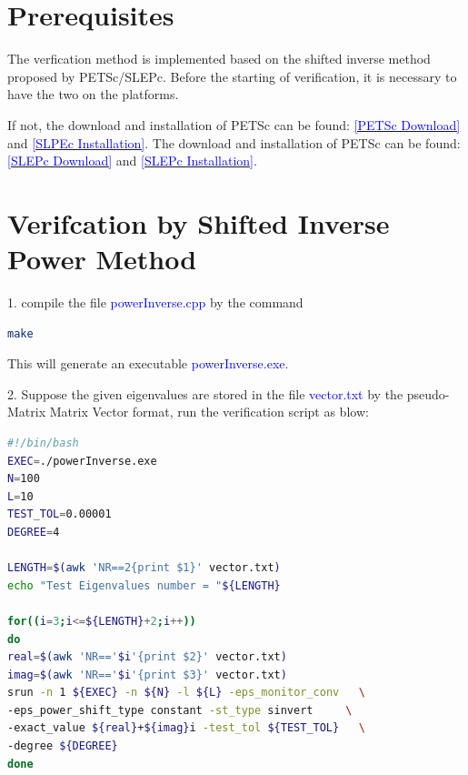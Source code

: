\documentclass[a4paper, 10 pt]{report}
\begin{document}
	\section{Prerequisites}
	
	The verfication method is implemented based on the shifted inverse method proposed by PETSc/SLEPc. Before the starting of verification, it is necessary to have the two on the platforms.
	
	If not, the download and installation of PETSc can be found: \href{https://www.mcs.anl.gov/petsc/download/index.html}{\textcolor{blue}{[PETSc Download]}} and \href{https://www.mcs.anl.gov/petsc/documentation/installation.html}{\textcolor{blue}{[SLPEc Installation]}}. The download and installation of PETSc can be found: \href{http://slepc.upv.es/download/}{\textcolor{blue}{[SLEPc Download]}} and \href{http://slepc.upv.es/documentation/instal.htm}{\textcolor{blue}{[SLEPc Installation]}}.
	
	\section{Verifcation by Shifted Inverse Power Method}
	
	1. compile the file \textcolor{blue}{powerInverse.cpp} by the command
	
	\begin{lstlisting}[language=bash,frame=single]
   make
	\end{lstlisting}
	
	This will generate an executable  \textcolor{blue}{powerInverse.exe}.
	
	2. Suppose the given eigenvalues are stored in the file \textcolor{blue}{vector.txt} by the pseudo-Matrix Matrix Vector format, run the verification script as blow:
		\begin{lstlisting}[language=bash,frame=single]
#!/bin/bash
EXEC=./powerInverse.exe
N=100
L=10
TEST_TOL=0.00001
DEGREE=4

LENGTH=$(awk 'NR==2{print $1}' vector.txt)
echo "Test Eigenvalues number = "${LENGTH}

for((i=3;i<=${LENGTH}+2;i++))
do
real=$(awk 'NR=='$i'{print $2}' vector.txt)
imag=$(awk 'NR=='$i'{print $3}' vector.txt)
srun -n 1 ${EXEC} -n ${N} -l ${L} -eps_monitor_conv   \
-eps_power_shift_type constant -st_type sinvert     \
-exact_value ${real}+${imag}i -test_tol ${TEST_TOL}   \
-degree ${DEGREE}
done

   \end{lstlisting}
\end{document}
